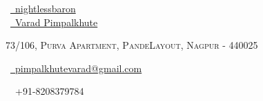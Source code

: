 \documentclass[a4paper,10pt]{extarticle} %
\begin{document}
\pagestyle{empty} %




\begin{multicols}{3}
\normalsize \faGithub\ {\href{https://github.com/nightlessbaron}{\  nightlessbaron}}\\
\normalsize  \faLinkedinSquare\ {\href{https://www.linkedin.com/in/varad-pimpalkhute-a526a9167/}{\  Varad Pimpalkhute}}\\
\columnbreak
\normalsize\par{\centering{\huge\textsc{\textcolor{primary}{Varad Pimpalkhute}}}\par} %
\par{\centering\normalsize {\textsc{73/106, Purva Apartment, PandeLayout, Nagpur - 440025}}\hfill\par}
\columnbreak
\raggedright\hfill\normalsize \faEnvelope\ {\href{mailto:pimpalkhutevarad@gmail.com}{\  pimpalkhutevarad@gmail.com}}\\
\raggedright\hfill{\faPhone\ \  +91-8208379784}
\end{multicols}


\end{document}
